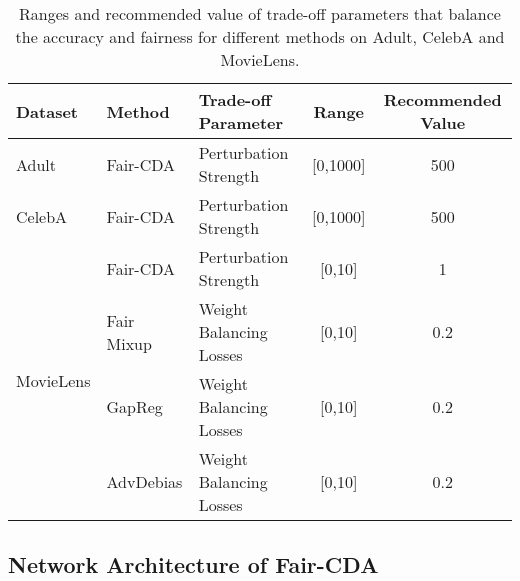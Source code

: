 \begin{table}[h]
\centering
\caption{Ranges and recommended value of trade-off parameters that balance the accuracy and fairness for different methods on Adult, CelebA and MovieLens.}
\label{table:hyperparameter}
    \begin{adjustbox}{max width=0.47\textwidth}
        \begin{tabular}{lllcc}
            \hline
            \hline
            Dataset & Method & Trade-off Parameter  & Range & Recommended Value \\
           \hline
            Adult	& Fair-CDA & Perturbation Strength  & [0,1000] & 500\\
            \hline
            CelebA	& Fair-CDA & Perturbation Strength   & [0,1000] & 500\\
            \hline
            \multirow{4}{*}{MovieLens} & Fair-CDA   & Perturbation Strength   & [0,10] & 1    \\	
                                       & Fair Mixup & Weight Balancing Losses & [0,10] & 0.2  \\
                                       & GapReg     & Weight Balancing Losses & [0,10] & 0.2  \\
                                       & AdvDebias  & Weight Balancing Losses & [0,10] & 0.2  \\
            \hline\hline
        \end{tabular}
    \end{adjustbox}
\end{table}


\subsection{Network Architecture of Fair-CDA}


